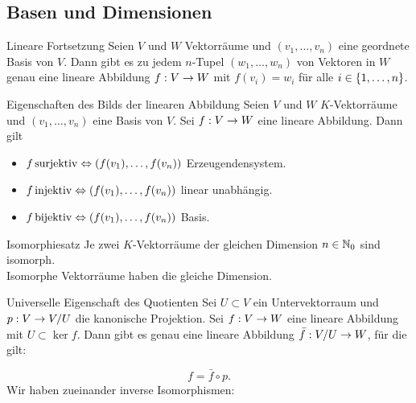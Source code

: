 \documentclass[main.tex]{subfiles}
\begin{document}
\subsection*{Basen und Dimensionen}
\begin{karte}{Lineare Fortsetzung}
    Seien \(V\) und \(W\) Vektorräume und \( (v_1,\ldots,v_n) \) 
    eine geordnete Basis von \(V\). Dann gibt es zu jedem 
    \(n\)-Tupel \((w_1,\ldots,w_n)\) von Vektoren in \(W\) 
    genau eine lineare Abbildung \( f : V \rightarrow W \) mit 
    \( f(v_i) = w_i \) für alle \( i \in \{1,\ldots,n\} \).
\end{karte}
\begin{karte}{Eigenschaften des Bilds der linearen Abbildung}
    Seien \(V\) und \(W\) \(K\)-Vektorräume und 
    \((v_1,\ldots,v_n)\) eine Basis von \(V\). Sei 
    \( f : V \rightarrow W \) eine lineare Abbildung. Dann gilt 
    \begin{itemize}
        \item \( f \operatorname{surjektiv} \Leftrightarrow 
        (f(v_1),\ldots,f(v_n)) \) Erzeugendensystem.
        \item \( f \operatorname{injektiv} \Leftrightarrow 
        (f(v_1),\ldots,f(v_n)) \) linear unabhängig.
        \item \( f \operatorname{bijektiv} \Leftrightarrow
        (f(v_1),\ldots,f(v_n)) \) Basis.
    \end{itemize}
\end{karte}
\begin{karte}{Isomorphiesatz}
    Je zwei \(K\)-Vektorräume der gleichen Dimension 
    \( n \in \mathbb{N}_0 \) sind isomorph.\\
    Isomorphe Vektorräume haben die gleiche Dimension.
\end{karte}
\begin{karte}{Universelle Eigenschaft des Quotienten}
    Sei \( U \subset V \) ein Untervektorraum und 
    \( p : V \rightarrow V/U \) die kanonische Projektion. 
    Sei \( f : V \rightarrow W \) eine lineare Abbildung 
    mit \( U \subset \ker f \). Dann gibt es genau eine 
    lineare Abbildung \( \bar{f} : V/U \rightarrow W \), 
    für die gilt:
    \begin{center}
    \end{center}
    \[ f = \bar{f} \circ p. \]
    Wir haben zueinander inverse Isomorphismen:
    \begin{center}
    \end{center}
\end{karte}
\end{document}

